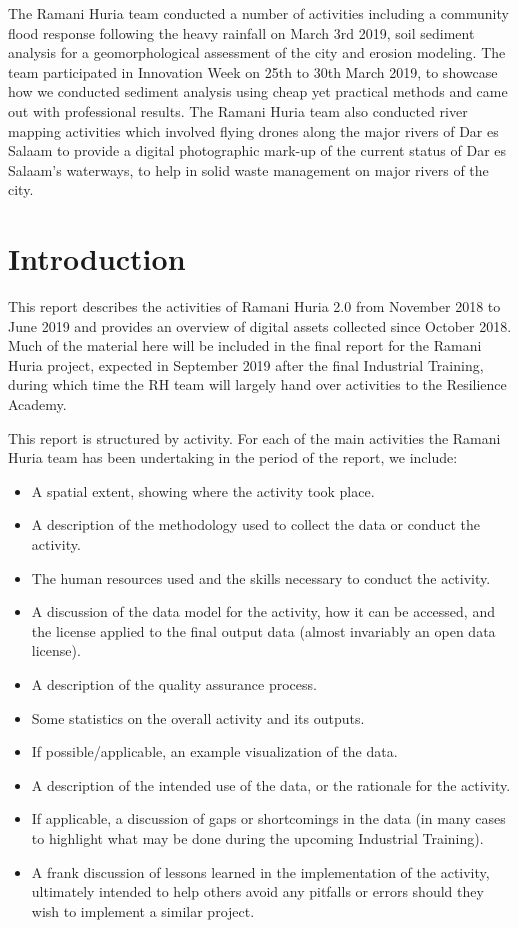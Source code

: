 \documentclass[a4paper,12pt,twoside]{article}
\begin{document}
\begin{multicols}{2}
The Ramani Huria team conducted a number of activities including a community flood response following the heavy rainfall on March 3rd 2019, soil sediment analysis for a geomorphological assessment of the city and erosion modeling. The team participated in Innovation Week on 25th to 30th March 2019, to showcase how we conducted sediment analysis using cheap yet practical methods and came out with professional results. The Ramani Huria team also conducted river mapping activities which involved flying drones along the major rivers of Dar es Salaam to  provide a digital photographic mark-up of the current status of Dar es Salaam’s waterways, to help in solid waste management on major rivers of the city.

\end{multicols}

\newpage
\section{Introduction}
\label{Introduction}

This report describes the activities of Ramani Huria 2.0 from November 2018 to June 2019 and provides an overview of digital assets collected since October 2018. Much of the material here will be included in the final report for the Ramani Huria project, expected in September 2019 after the final Industrial Training, during which time the RH team will largely hand over activities to the Resilience Academy.

This report is structured by activity. For each of the main activities the Ramani Huria team has been undertaking in the period of the report, we include:

\begin{itemize}
  \item A spatial extent, showing where the activity took place.
  \item A description of the methodology used to collect the data or conduct the activity.
  \item The human resources used and the skills necessary to conduct the activity.
  \item A discussion of the data model for the activity, how it can be accessed, and the license applied to the final output data (almost invariably an open data license).
  \item A description of the quality assurance process.
  \item Some statistics on the overall activity and its outputs.
  \item If possible/applicable, an example visualization of the data.
  \item A description of the intended use of the data, or the rationale for the activity.
  \item If applicable, a discussion of gaps or shortcomings in the data (in many cases to highlight what may be done during the upcoming Industrial Training).
  \item A frank discussion of lessons learned in the implementation of the activity, ultimately intended to help others avoid any pitfalls or errors should they wish to implement a similar project.
\end{itemize}
\end{document}

